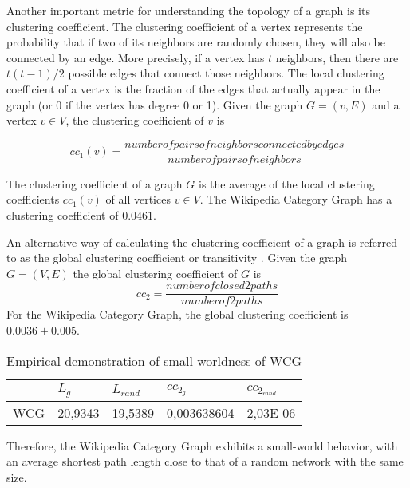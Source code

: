 Another important metric for understanding the topology of a graph is its clustering coefficient. The clustering coefficient of a vertex represents the probability that if two of its neighbors are randomly chosen, they will also be connected by an edge. More precisely, if a vertex has $t$ neighbors, then there are $t(t-1)/2$ possible edges that connect those neighbors. The local clustering coefficient of a vertex is the fraction of the edges that actually appear in the graph (or 0 if the vertex has degree 0 or 1). Given the graph $G= (v,E)$ and a vertex $v \in V$, the clustering coefficient of $v$ is 

\begin{equation}\label{eq:cc1}
cc_1(v) = \dfrac{number of pairs of neighbors connected by edges}{number of pairs of neighbors}  
\end{equation} 

The clustering coefficient of a graph $G$ is the average of the local clustering coefficients $cc_1(v)$ of all vertices $v \in V$. The Wikipedia Category Graph has a clustering coefficient of $0.0461$. 

An alternative way of calculating the clustering coefficient of a graph is referred to as the global clustering coefficient or transitivity \cite{newman2001random}. Given the graph $G = (V,E)$ the global clustering coefficient of $G$ is
\begin{equation}\label{eq:cc2}
cc_2 = \dfrac{number of closed 2paths}{number of 2paths}
\end{equation} For the Wikipedia Category Graph, the global clustering coefficient is $0.0036\pm0.005$. 



\begin{table}[!h]
\centering
\begin{tabular}{@{}lllll@{}}
\toprule
    & $L_g$       & $L_{rand}$       & $cc_{2_g}$           & $cc_{2_{rand}}$        \\ \midrule
WCG & 20,9343 & 19,5389 & 0,003638604 & 2,03E-06 \\ \bottomrule
\end{tabular}
\caption{Empirical demonstration of small-worldness of WCG }
\label{small-worldness}
\end{table}

Therefore, the Wikipedia Category Graph exhibits a small-world behavior, with an average shortest path length close to that of a random network with the same size.



